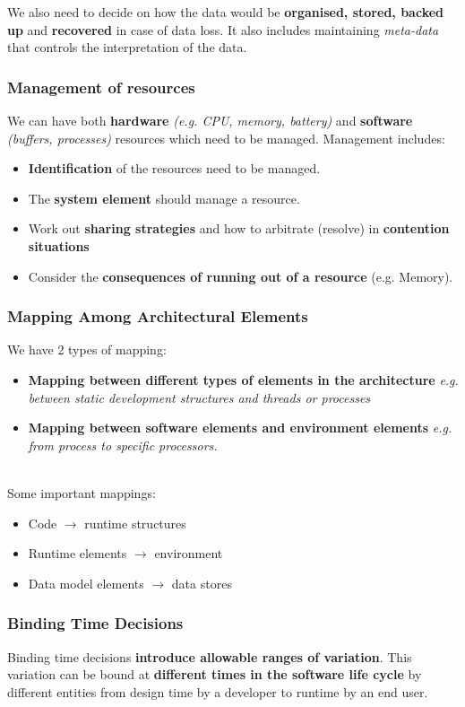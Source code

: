\documentclass[a4paper]{article}
\begin{document}
We also need to decide on how the data would be \textbf{organised, stored, backed up} and \textbf{recovered} in case of data loss. It also includes maintaining \textit{meta-data} that controls the interpretation of the data.


\subsubsection{Management of resources}
We can have both \textbf{hardware} \textit{(e.g. CPU, memory, battery)} and \textbf{software} \textit{(buffers, processes)} resources which need to be managed. Management includes:
\begin{itemize}
\item \textbf{Identification} of the resources need to be managed.
\item The \textbf{system element} should manage a resource.
\item Work out \textbf{sharing strategies} and how to arbitrate (resolve) in \textbf{contention situations}
\item Consider the \textbf{consequences of running out of a resource} (e.g. Memory).
\end{itemize}

\subsubsection{Mapping Among Architectural Elements}
We have 2 types of mapping:
\begin{itemize}
\item \textbf{Mapping between different types of elements in the architecture} 
\textit{e.g. between static development structures and threads or processes}
\item \textbf{Mapping between software elements and environment elements} 
\textit{e.g. from process to specific processors.}\\\\
\end{itemize}


Some important mappings: 
\begin{itemize}
\item Code $\rightarrow$ runtime structures
\item Runtime elements $\rightarrow$ environment
\item Data model elements $\rightarrow$ data stores
\end{itemize}

\subsubsection{Binding Time Decisions}
Binding time decisions \textbf{introduce allowable ranges of variation}. This variation can be bound at \textbf{different times in the software life cycle} by different entities from design time by a developer to runtime by an end user. 
\end{document}
